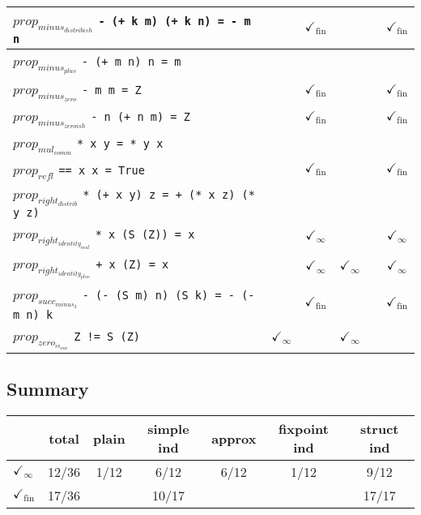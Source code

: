 \documentclass{article}
\begin{document}
\begin{longtable}{p{9cm} || c | c | c | c | c | }
\hline
$prop_{minus_{distribish}}$ \newline \verb`- (+ k m) (+ k n) = - m n` &  & $\checkmark_{\mathrm{fin}}$ &  &  & $\checkmark_{\mathrm{fin}}$ \\
\hline
$prop_{minus_{plus}}$ \newline \verb`- (+ m n) n = m` &  &  &  &  &  \\
\hline
$prop_{minus_{zero}}$ \newline \verb`- m m = Z` &  & $\checkmark_{\mathrm{fin}}$ &  &  & $\checkmark_{\mathrm{fin}}$ \\
\hline
$prop_{minus_{zeroish}}$ \newline \verb`- n (+ n m) = Z` &  & $\checkmark_{\mathrm{fin}}$ &  &  & $\checkmark_{\mathrm{fin}}$ \\
\hline
$prop_{mul_{comm}}$ \newline \verb`* x y = * y x` &  &  &  &  &  \\
\hline
$prop_{refl}$ \newline \verb`== x x = True` &  & $\checkmark_{\mathrm{fin}}$ &  &  & $\checkmark_{\mathrm{fin}}$ \\
\hline
$prop_{right_{distrib}}$ \newline \verb`* (+ x y) z = + (* x z) (* y z)` &  &  &  &  &  \\
\hline
$prop_{right_{identity_{mul}}}$ \newline \verb`* x (S (Z)) = x` &  & $\checkmark_{\infty}$ &  &  & $\checkmark_{\infty}$ \\
\hline
$prop_{right_{identity_{plus}}}$ \newline \verb`+ x (Z) = x` &  & $\checkmark_{\infty}$ & $\checkmark_{\infty}$ &  & $\checkmark_{\infty}$ \\
\hline
$prop_{succ_{minus_{3}}}$ \newline \verb`- (- (S m) n) (S k) = - (- m n) k` &  & $\checkmark_{\mathrm{fin}}$ &  &  & $\checkmark_{\mathrm{fin}}$ \\
\hline
$prop_{zero_{is_{one}}}$ \newline \verb`Z != S (Z)` & $\checkmark_{\infty}$ &  & $\checkmark_{\infty}$ &  &  \\
\end{longtable}

\subsection*{Summary}
\begin{longtable}{p{4cm} || c | c | c | c | c | c | }
  & total & plain & simple ind & approx & fixpoint ind & struct ind \\
\hline
$\checkmark_{\infty}$ & 12/36 & 1/12 & 6/12 & 6/12 & 1/12 & 9/12\\
\hline
$\checkmark_{\mathrm{fin}}$ & 17/36 &  & 10/17 &  &  & 17/17\\
\end{longtable}
\end{document}
